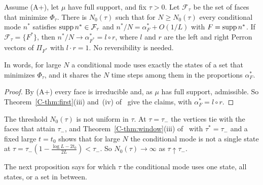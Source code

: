 \begin{corollary}\label{cor:map}
Assume \textup{(A+)}, let $\mu$ have full support, and fix $\tau>0$. Let
$\mathcal F_\tau$ be the set of faces that minimize $\Phi_\tau$. There is
$N_0(\tau)$ such that for $N\ge N_0(\tau)$ every conditional mode $n^*$
satisfies $\operatorname{supp} n^*\in\mathcal F_\tau$ and $n^*/N=\alpha^*_F+O(1/L)$ with
$F=\operatorname{supp} n^*$. If $\mathcal F_\tau=\{F^*\}$, then
$n^*/N\to\alpha^*_{F^*}=l\circ r$, where $l$ and $r$ are the left and right
Perron vectors of $\Pi_{F^*}$ with $l\cdot r=1$. No reversibility is needed.
\end{corollary}

In words, for large $N$ a conditional mode uses exactly the states of a set that
minimizes $\Phi_\tau$, and it shares the $N$ time steps among them in the
proportions $\alpha^*_F$.

\begin{proof}
By (A+) every face is irreducible and, as $\mu$ has full support,
admissible. So Theorem~\ref*{C-thm:first}(iii) and~(iv) of~\cite{paperC} give the claims, with
$\alpha^*_F=l\circ r$.
\end{proof}

The threshold $N_0(\tau)$ is not uniform in $\tau$. At $\tau=\tau_-$ the
vertices tie with the faces that attain $\tau_-$, and
Theorem~\ref*{C-thm:window}(iii) of~\cite{paperC} with $\tau^*=\tau_-$ and a fixed large $t=t_0$
shows that for large $N$ the conditional mode is not a single state at
$\tau=\tau_-(1-\frac{\log L-2t_0}{2L})<\tau_-$. So $N_0(\tau)\to\infty$ as
$\tau\uparrow\tau_-$.

The next proposition says for which $\tau$ the conditional mode uses one state, all
states, or a set in between.

